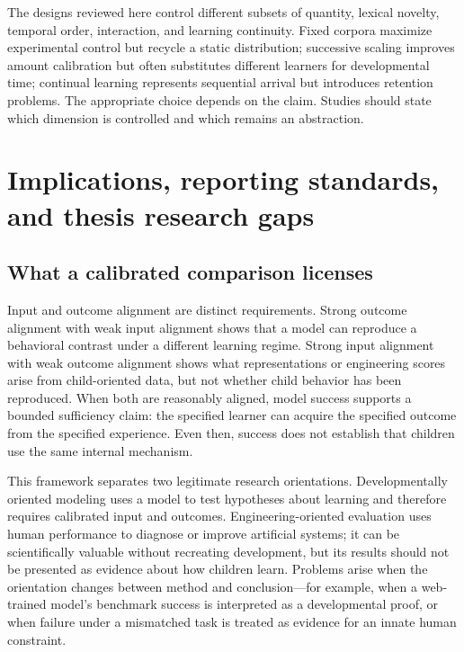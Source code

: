 The designs reviewed here control different subsets of quantity, lexical novelty, temporal order, interaction, and learning continuity. Fixed corpora maximize experimental control but recycle a static distribution; successive scaling improves amount calibration but often substitutes different learners for developmental time; continual learning represents sequential arrival but introduces retention problems. The appropriate choice depends on the claim. Studies should state which dimension is controlled and which remains an abstraction.


\section{Implications, reporting standards, and thesis research gaps}
\label{sec:litreview:implications}

\subsection{What a calibrated comparison licenses}
\label{sec:litreview:inference}

Input and outcome alignment are distinct requirements. Strong outcome alignment with weak input alignment shows that a model can reproduce a behavioral contrast under a different learning regime. Strong input alignment with weak outcome alignment shows what representations or engineering scores arise from child-oriented data, but not whether child behavior has been reproduced. When both are reasonably aligned, model success supports a bounded sufficiency claim: the specified learner can acquire the specified outcome from the specified experience. Even then, success does not establish that children use the same internal mechanism.

This framework separates two legitimate research orientations. Developmentally oriented modeling uses a model to test hypotheses about learning and therefore requires calibrated input and outcomes. Engineering-oriented evaluation uses human performance to diagnose or improve artificial systems; it can be scientifically valuable without recreating development, but its results should not be presented as evidence about how children learn. Problems arise when the orientation changes between method and conclusion---for example, when a web-trained model's benchmark success is interpreted as a developmental proof, or when failure under a mismatched task is treated as evidence for an innate human constraint.

